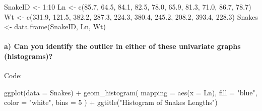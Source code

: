 \documentclass[
]{article}
\newenvironment{Shaded}{\begin{snugshade}}{\end{snugshade}}
\newcommand{\AttributeTok}[1]{\textcolor[rgb]{0.77,0.63,0.00}{#1}}
\newcommand{\DecValTok}[1]{\textcolor[rgb]{0.00,0.00,0.81}{#1}}
\newcommand{\FloatTok}[1]{\textcolor[rgb]{0.00,0.00,0.81}{#1}}
\newcommand{\FunctionTok}[1]{\textcolor[rgb]{0.00,0.00,0.00}{#1}}
\newcommand{\NormalTok}[1]{#1}
\newcommand{\OtherTok}[1]{\textcolor[rgb]{0.56,0.35,0.01}{#1}}
\newcommand{\SpecialCharTok}[1]{\textcolor[rgb]{0.00,0.00,0.00}{#1}}
\newcommand{\StringTok}[1]{\textcolor[rgb]{0.31,0.60,0.02}{#1}}
\begin{document}
\begin{Shaded}
\begin{Highlighting}[]
\NormalTok{SnakeID }\OtherTok{\textless{}{-}} \DecValTok{1}\SpecialCharTok{:}\DecValTok{10}
\NormalTok{Ln }\OtherTok{\textless{}{-}} \FunctionTok{c}\NormalTok{(}\FloatTok{85.7}\NormalTok{, }\FloatTok{64.5}\NormalTok{, }\FloatTok{84.1}\NormalTok{, }\FloatTok{82.5}\NormalTok{, }\FloatTok{78.0}\NormalTok{, }\FloatTok{65.9}\NormalTok{, }\FloatTok{81.3}\NormalTok{, }\FloatTok{71.0}\NormalTok{, }\FloatTok{86.7}\NormalTok{, }\FloatTok{78.7}\NormalTok{)}
\NormalTok{Wt }\OtherTok{\textless{}{-}}
  \FunctionTok{c}\NormalTok{(}\FloatTok{331.9}\NormalTok{,}
    \FloatTok{121.5}\NormalTok{,}
    \FloatTok{382.2}\NormalTok{,}
    \FloatTok{287.3}\NormalTok{,}
    \FloatTok{224.3}\NormalTok{,}
    \FloatTok{380.4}\NormalTok{,}
    \FloatTok{245.2}\NormalTok{,}
    \FloatTok{208.2}\NormalTok{,}
    \FloatTok{393.4}\NormalTok{,}
    \FloatTok{228.3}\NormalTok{)}
\NormalTok{Snakes }\OtherTok{\textless{}{-}} \FunctionTok{data.frame}\NormalTok{(SnakeID, Ln, Wt)}
\end{Highlighting}
\end{Shaded}

\newpage

\hypertarget{a-can-you-identify-the-outlier-in-either-of-these-univariate-graphs-histograms}{%
\paragraph{a) Can you identify the outlier in either of these univariate
graphs
(histograms)?}\label{a-can-you-identify-the-outlier-in-either-of-these-univariate-graphs-histograms}}

Code:

\begin{Shaded}
\begin{Highlighting}[]
\FunctionTok{ggplot}\NormalTok{(}\AttributeTok{data =}\NormalTok{ Snakes) }\SpecialCharTok{+}
  \FunctionTok{geom\_histogram}\NormalTok{(}
    \AttributeTok{mapping =} \FunctionTok{aes}\NormalTok{(}\AttributeTok{x =}\NormalTok{ Ln),}
    \AttributeTok{fill =} \StringTok{"blue"}\NormalTok{,}
    \AttributeTok{color =} \StringTok{"white"}\NormalTok{,}
    \AttributeTok{bins =} \DecValTok{5}
\NormalTok{  ) }\SpecialCharTok{+}
  \FunctionTok{ggtitle}\NormalTok{(}\StringTok{"Histogram of Snakes Lengths"}\NormalTok{)}
\end{Highlighting}
\end{Shaded}
\end{document}
